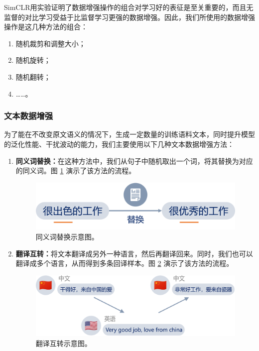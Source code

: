 \documentclass[a4paper]{zreport}
\begin{document}
SimCLR用实验证明了数据增强操作的组合对学习好的表征是至关重要的，而且无监督的对比学习受益于比监督学习更强的数据增强。因此，我们所使用的数据增强操作是这几种方法的组合：
\begin{enumerate}
\item 随机裁剪和调整大小；
\item 随机旋转；
\item 随机翻转；
\item ……。
\end{enumerate}

\subsubsection{文本数据增强}

为了能在不改变原文语义的情况下，生成一定数量的训练语料文本，同时提升模型的泛化性能、干扰波动的能力，我们主要使用以下几种文本数据增强方法：

\begin{enumerate}
\item \textbf{同义词替换：}在这种方法中，我们从句子中随机取出一个词，将其替换为对应的同义词。图 \ref{fig:augment} 演示了该方法的流程。
\begin{figure}[h]
\centering
\includegraphics[width=0.7\linewidth]{figures/augment}
\caption{同义词替换示意图。}
\label{fig:augment}
\end{figure}

\item \textbf{翻译互转：}将文本翻译成另外一种语言，然后再翻译回来。同时，我们也可以翻译成多个语言，从而得到多条回译样本。图 \ref{fig:translate} 演示了该方法的流程。
\begin{figure}[h]
\centering
\includegraphics[width=\linewidth]{figures/translate}
\caption{翻译互转示意图。}
\label{fig:translate}
\end{figure}
\end{enumerate}
\end{document}
